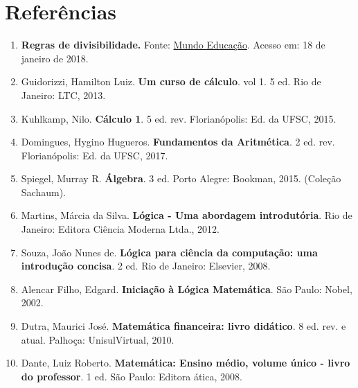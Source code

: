 \chapter*{Referências}

 \begin{enumerate}[(1)]
  \item \textbf{Regras de divisibilidade.} Fonte: \href{http://mundoeducacao.bol.uol.com.br/matematica/regras-divisibilidade.htm}{Mundo Educação}. Acesso em: 18 de janeiro de 2018.

  \item Guidorizzi, Hamilton Luiz. \textbf{Um curso de cálculo}. vol 1. 5 ed. Rio de Janeiro: LTC, 2013.

  \item Kuhlkamp, Nilo. \textbf{Cálculo 1}. 5 ed. rev. Florianópolis: Ed. da UFSC, 2015.
  
  \item Domingues, Hygino Hugueros. \textbf{Fundamentos da Aritmética}. 2 ed. rev. Florianópolis: Ed. da UFSC, 2017.

  \item Spiegel, Murray R. \textbf{Álgebra}. 3 ed. Porto Alegre: Bookman, 2015. (Coleção Sachaum).

  \item Martins, Márcia da Silva. \textbf{Lógica - Uma abordagem introdutória}. Rio de Janeiro: Editora Ciência Moderna Ltda., 2012.

  \item Souza, João Nunes de. \textbf{Lógica para ciência da computação: uma introdução concisa}. 2 ed. Rio de Janeiro: Elsevier, 2008.

  \item Alencar Filho, Edgard. \textbf{Iniciação à Lógica Matemática}. São Paulo: Nobel, 2002.

  \item Dutra, Maurici José. \textbf{Matemática financeira: livro didático}. 8 ed. rev. e atual. Palhoça: UnisulVirtual, 2010.

  \item Dante, Luiz Roberto. \textbf{Matemática: Ensino médio, volume único - livro do professor}. 1 ed. São Paulo: Editora ática, 2008.

  \end{enumerate}
